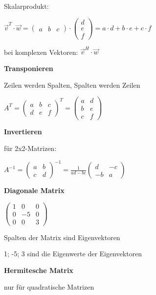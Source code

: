 Skalarprodukt:

$\displaystyle{
    \vec{v}^T \cdot \vec{w} = 
    \begin{pmatrix}
        a & b & c
    \end{pmatrix}
    \cdot
    \begin{pmatrix}
        d\\
        e\\
        f
    \end{pmatrix}
    = a \cdot d + b \cdot e + c \cdot f
}$

bei komplexen Vektoren:
$\displaystyle{
    \vec{v}^H \cdot \vec{w}
}$

\textbf{Transponieren}

Zeilen werden Spalten, Spalten werden Zeilen

$\displaystyle{
    A^T =
    \begin{pmatrix}
        a & b & c\\
        d & e & f
    \end{pmatrix}^T
    =
    \begin{pmatrix}
        a & d\\
        b & e\\
        c & f
    \end{pmatrix}
}$

\textbf{Invertieren}

für 2x2-Matrizen:

$\displaystyle{
    A^{-1} =
    \begin{pmatrix}
        a & b\\
        c & d
    \end{pmatrix}^{-1}
    = \frac{1}{ad - bc}
    \begin{pmatrix}
        d & -c\\
        -b & a
    \end{pmatrix}
}$

\textbf{Diagonale Matrix}

$\displaystyle{
    \begin{pmatrix}
        1 & 0 & 0\\
        0 & -5 & 0\\
        0 & 0 & 3
    \end{pmatrix}
}$

Spalten der Matrix sind Eigenvektoren

1; -5; 3 sind die Eigenwerte der Eigenvektoren

\textbf{Hermitesche Matrix}

nur für quadratische Matrizen

